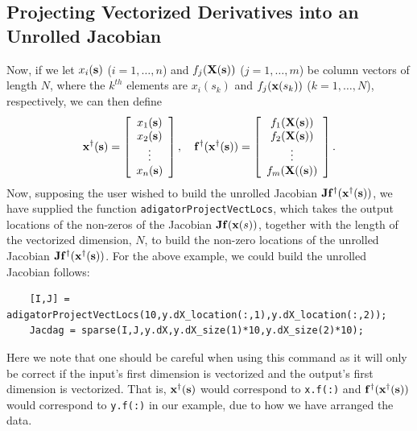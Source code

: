 \documentclass[10pt,pdftex]{article}
\begin{document}
\subsection{Projecting Vectorized Derivatives into an Unrolled Jacobian}
Now, if we let $x_i(\mathbf{s})$ ($i = 1,\dots,n$) and $f_j(\mathbf{X}(\mathbf{s}))$ ($j = 1,\dots,m$) be column vectors of length $N$, where the $k^{th}$ elements are $x_i(s_k)$  and $f_j(\mathbf{x}(s_k))$ ($k = 1,\dots,N$), respectively, we can then define
\begin{equation}
\mathbf{x}^\dag(\mathbf{s}) = \left[ \begin{array}{c}
x_1(\mathbf{s}) \\ x_2(\mathbf{s}) \\ \vdots \\ x_n(\mathbf{s})
\end{array}\right], \quad 
\mathbf{f}^\dag(\mathbf{x}^\dag(\mathbf{s})) = \left[ \begin{array}{c}
f_1(\mathbf{X}(\mathbf{s})) \\ f_2(\mathbf{X}(\mathbf{s})) \\ \vdots \\ f_m(\mathbf{X}((\mathbf{s}))
\end{array}\right].
\end{equation}
Now, supposing the user wished to build the unrolled Jacobian $\mathbf{J}\mathbf{f}^\dag(\mathbf{x}^\dag(\mathbf{s}))$, we have supplied the function \texttt{adigatorProjectVectLocs}, which takes the output locations of the non-zeros of the Jacobian $\mathbf{J}\mathbf{f}(\mathbf{x}(s))$, together with the length of the vectorized dimension, $N$, to build the non-zero locations of the unrolled Jacobian $\mathbf{J}\mathbf{f}^\dag(\mathbf{x}^\dag(\mathbf{s}))$. For the above example, we could build the unrolled Jacobian follows:
\begin{verbatim}
    [I,J] = adigatorProjectVectLocs(10,y.dX_location(:,1),y.dX_location(:,2));
    Jacdag = sparse(I,J,y.dX,y.dX_size(1)*10,y.dX_size(2)*10);
\end{verbatim}
Here we note that one should be careful when using this command as it will only be correct if the input's first dimension is vectorized and the output's first dimension is vectorized. That is, $\mathbf{x}^\dag(\mathbf{s})$ would correspond to \texttt{x.f(:)}  and $\mathbf{f}^\dag(\mathbf{x}^\dag(\mathbf{s}))$ would correspond to \texttt{y.f(:)} in our example, due to how we have arranged the data.
\end{document}
